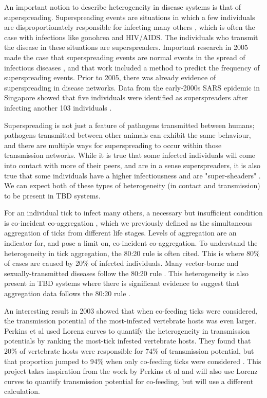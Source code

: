 \documentclass{article}
\begin{document}
An important notion to describe heterogeneity in disease systems is that of superspreading. Superspreading events are situations in which a few individuals are disproportionately responsible for infecting many others \cite{Galvani_2005}, which is often the case with infections like gonohrea and HIV/AIDS. The individuals who transmit the disease in these situations are superspreaders. Important research in 2005 made the case that superspreading events are normal events in the spread of infectious diseases \cite{LloydSmith2005}, and that work included a method to predict the frequency of superspreading events. Prior to 2005, there was already evidence of superspreading in disease networks. Data from the early-2000s SARS epidemic in Singapore showed that five individuals were identified as superspreaders after infecting another 103 individuals \cite{CDC2003}.

Superspreading is not just a feature of pathogens transmitted between humans; pathogens transmitted between other animals can exhibit the same behaviour, and there are multiple ways for superspreading to occur within those transmission networks. While it is true that some infected individuals will come into contact with more of their peers, and are in a sense superspreaders, it is also true that some individuals have a higher infectiousness and are "super-sheaders" \cite{VanderWaal_2016}. We can expect both of these types of heterogeneity (in contact and transmission) to be present in TBD systems.

For an individual tick to infect many others, a necessary but insufficient condition is co-incident co-aggregation \cite{Ferreri2014}, which we previously defined as the simultaneous aggregation of ticks from different life stages. Levels of aggregation are an indicator for, and pose a limit on, co-incident co-aggregation. To understand the heterogeneity in tick aggregation, the 80:20 rule is often cited. This is where 80\% of cases are caused by 20\% of infected individuals. Many vector-borne and sexually-transmitted diseases follow the 80:20 rule \cite{Woolhouse1997}. This heterogeneity is also present in TBD systems where there is significant evidence to suggest that aggregation data follows the 80:20 rule \cite{Ferreri2014, Brunner2008, JohnstoneRobertson2020}.

An interesting result in 2003 showed that when co-feeding ticks were considered, the transmission potential of the most-infested vertebrate hosts was even larger. Perkins et al used Lorenz curves to quantify the heterogeneity in transmission potentials by ranking the most-tick infested vertebrate hosts. They found that 20\% of vertebrate hosts were responsible for 74\% of transmission potential, but that proportion jumped to 94\% when only co-feeding ticks were considered \cite{Perkins_2003}. This project takes inspiration from the work by Perkins et al and will also use Lorenz curves to quantify transmission potential for co-feeding, but will use a different calculation.
\end{document}
